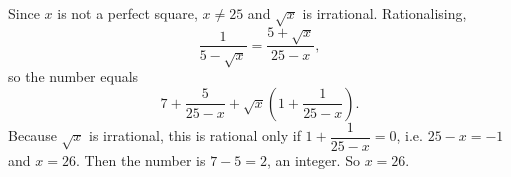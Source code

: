 Since $x$ is not a perfect square, $x\ne25$ and $\sqrt x$ is irrational. Rationalising,
\[\dfrac{1}{5-\sqrt x}=\dfrac{5+\sqrt x}{25-x},\]
so the number equals
\[7+\dfrac{5}{25-x}+\sqrt x\left(1+\dfrac{1}{25-x}\right).\]
Because $\sqrt x$ is irrational, this is rational only if $1+\dfrac1{25-x}=0$, i.e. $25-x=-1$ and $x=26$. Then the number is $7-5=2$, an integer. So $x=\boxed{26}$.
